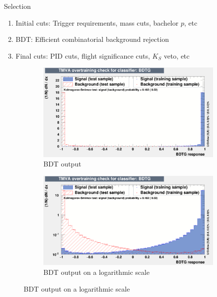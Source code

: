 \documentclass{beamer}
\begin{document}
\begin{frame}{Selection}
  \begin{enumerate}
    \setlength\itemsep{1.0em}
    \item{Initial cuts: Trigger requirements, mass cuts, bachelor $p$, etc}
    \item{BDT: Efficient combinatorial background rejection}
    \item{Final cuts: PID cuts, flight significance cuts, $K_S$ veto, etc}
  \end{enumerate}
  \vspace{0.5cm}
  \begin{figure}
    \centering
    \vspace{-0.2cm}
    \begin{subfigure}{0.5\textwidth}
      \includegraphics[width = 1.0\textwidth]{Plots/overtrain_BDTG.png}
      \caption{BDT output}
    \end{subfigure}%
    \begin{subfigure}{0.5\textwidth}
      \includegraphics[width = 1.0\textwidth]{Plots/overtrain_BDTG_log.png}
      \caption{BDT output on a logarithmic scale}
    \end{subfigure}
  \end{figure}
\end{frame}
\end{document}
